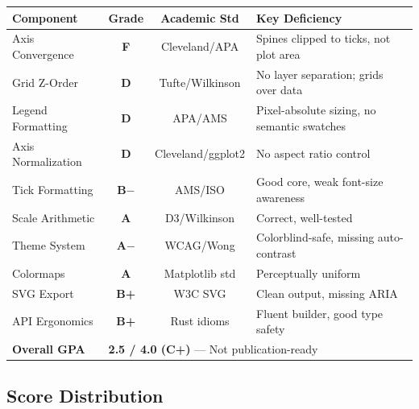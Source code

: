 \documentclass[11pt,a4paper]{article}
\begin{document}
\begin{center}
\begin{tabular}{l c c p{5cm}}
\toprule
\textbf{Component} & \textbf{Grade} & \textbf{Academic Std} & \textbf{Key Deficiency} \\
\midrule
\rowcolor{criticalred!8}
Axis Convergence & \textcolor{criticalred}{\textbf{F}} & Cleveland/APA
  & Spines clipped to ticks, not plot area \\
\rowcolor{criticalred!8}
Grid Z-Order & \textcolor{googred}{\textbf{D}} & Tufte/Wilkinson
  & No layer separation; grids over data \\
\rowcolor{warningyellow!8}
Legend Formatting & \textcolor{googred}{\textbf{D}} & APA/AMS
  & Pixel-absolute sizing, no semantic swatches \\
\rowcolor{warningyellow!8}
Axis Normalization & \textcolor{googred}{\textbf{D}} & Cleveland/ggplot2
  & No aspect ratio control \\
\rowcolor{googblue!6}
Tick Formatting & \textcolor{googblue}{\textbf{B$-$}} & AMS/ISO
  & Good core, weak font-size awareness \\
\rowcolor{okgreen!6}
Scale Arithmetic & \textcolor{okgreen}{\textbf{A}} & D3/Wilkinson
  & Correct, well-tested \\
\rowcolor{okgreen!6}
Theme System & \textcolor{okgreen}{\textbf{A$-$}} & WCAG/Wong
  & Colorblind-safe, missing auto-contrast \\
\rowcolor{okgreen!6}
Colormaps & \textcolor{okgreen}{\textbf{A}} & Matplotlib std
  & Perceptually uniform \\
\rowcolor{okgreen!6}
SVG Export & \textcolor{googblue}{\textbf{B+}} & W3C SVG
  & Clean output, missing ARIA \\
\rowcolor{googblue!6}
API Ergonomics & \textcolor{googblue}{\textbf{B+}} & Rust idioms
  & Fluent builder, good type safety \\
\midrule
\textbf{Overall GPA} & \multicolumn{3}{l}{\textbf{2.5 / 4.0 (C+)} — Not publication-ready} \\
\bottomrule
\end{tabular}
\end{center}

\subsection{Score Distribution}
\end{document}
